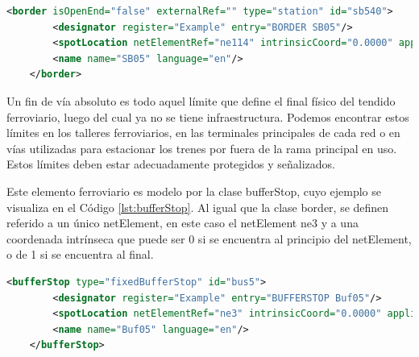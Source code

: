     \begin{lstlisting}[language = XML, caption = Clase border , label = {lst:lineBorder}]
    <border isOpenEnd="false" externalRef="" type="station" id="sb540">
        <designator register="Example" entry="BORDER SB05"/>
        <spotLocation netElementRef="ne114" intrinsicCoord="0.0000" applicationDirection="reverse" id="sb540_sloc01"/>
        <name name="SB05" language="en"/>
    </border>
    \end{lstlisting}

    Un fin de vía absoluto es todo aquel límite que define el final físico del tendido ferroviario, luego del cual ya no se tiene infraestructura. Podemos encontrar estos límites en los talleres ferroviarios, en las terminales principales de cada red o en vías utilizadas para estacionar los trenes por fuera de la rama principal en uso. Estos límites deben estar adecuadamente protegidos y señalizados.

    Este elemento ferroviario es modelo por la clase bufferStop, cuyo ejemplo se visualiza en el Código \ref{lst:bufferStop}. Al igual que la clase border, se definen referido a un único netElement, en este caso el netElement ne3 y a una coordenada intrínseca que puede ser 0 si se encuentra al principio del netElement, o de 1 si se encuentra al final.
    
    \begin{lstlisting}[language = XML, caption = Clase bufferStop , label = {lst:bufferStop}]
    <bufferStop type="fixedBufferStop" id="bus5">
        <designator register="Example" entry="BUFFERSTOP Buf05"/>
        <spotLocation netElementRef="ne3" intrinsicCoord="0.0000" applicationDirection="reverse" id="bus5_sloc01"/>
        <name name="Buf05" language="en"/>
    </bufferStop>
    \end{lstlisting}